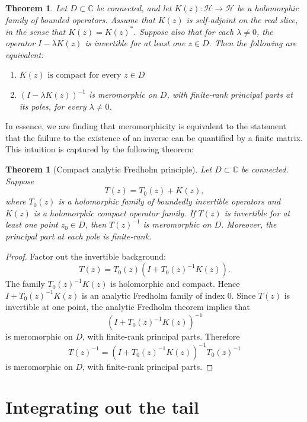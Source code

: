 \documentclass[JHEP,12pt]{article}
\newtheorem{theorem}[lemma]{Theorem}
\begin{document}
\begin{theorem}
Let \(D\subset\mathbb C\) be connected, and let
$K(z):\mathcal H\to\mathcal H$
be a holomorphic family of bounded operators. Assume that \(K(z)\) is
self-adjoint on the real slice, in the sense that $
K(\overline z)=K(z)^\ast $.
Suppose also that for each \(\lambda\neq 0\), the operator $
I-\lambda K(z)$
is invertible for at least one \(z\in D\). Then the following are equivalent: 
\begin{enumerate}
    \item $K(z)\text{ is compact for every }z\in D$
\item $
(I-\lambda K(z))^{-1}$
is meromorphic on \(D\), with finite-rank principal parts at its poles, for
every \(\lambda\neq 0\).
\end{enumerate}
\end{theorem}


In essence, we are finding that meromorphicity is equivalent to the statement that the failure to the existence of an inverse can be quantified by a finite matrix. This intuition is captured by the following theorem:

\begin{theorem}[Compact analytic Fredholm principle]
Let \(D\subset\mathbb C\) be connected. Suppose
\[
T(z)=T_0(z)+K(z),
\]
where \(T_0(z)\) is a holomorphic family of boundedly invertible operators and
\(K(z)\) is a holomorphic compact operator family. If \(T(z)\) is invertible for
at least one point \(z_0\in D\), then $T(z)^{-1}$
is meromorphic on \(D\). Moreover, the principal part at each pole is
finite-rank.
\end{theorem}

\begin{proof}
Factor out the invertible background:
\[
T(z)=T_0(z)\left(I+T_0(z)^{-1}K(z)\right).
\]
The family $T_0(z)^{-1}K(z)$
is holomorphic and compact. Hence $I+T_0(z)^{-1}K(z)$
is an analytic Fredholm family of index \(0\). Since \(T(z)\) is invertible at
one point, the analytic Fredholm theorem implies that
\[
\left(I+T_0(z)^{-1}K(z)\right)^{-1}
\]
is meromorphic on \(D\), with finite-rank principal parts. Therefore
\[
T(z)^{-1}
=
\left(I+T_0(z)^{-1}K(z)\right)^{-1}T_0(z)^{-1}
\]
is meromorphic on \(D\), with finite-rank principal parts.
\end{proof}



\section{Integrating out the tail}
\end{document}
